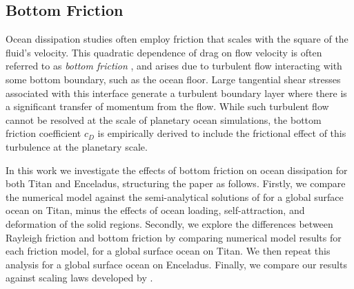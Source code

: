 \subsection{Bottom Friction}

Ocean dissipation studies often employ friction that scales with the square of the fluid's velocity. This quadratic dependence of drag on flow velocity is often referred to as \textit{bottom friction} \citep{gill1982atmosphere}, and arises due to turbulent flow interacting with some bottom boundary, such as the ocean floor. Large tangential shear stresses associated with this interface generate a turbulent boundary layer where there is a significant transfer of momentum from the flow. While such turbulent flow cannot be resolved at the scale of planetary ocean simulations, the bottom friction coefficient $c_D$ is empirically derived to include the frictional effect of this turbulence at the planetary scale.

In this work we investigate the effects of bottom friction on ocean dissipation for both Titan and Enceladus, structuring the paper as follows. Firstly, we compare the numerical model against the semi-analytical solutions of \citet{matsuyama2014tidal} for a global surface ocean on Titan, minus the effects of ocean loading, self-attraction, and deformation of the solid regions. Secondly, we explore the differences between Rayleigh friction and bottom friction by comparing numerical model results for each friction model, for a global surface ocean on Titan. We then repeat this analysis for a global surface ocean on Enceladus. Finally, we compare our results against scaling laws developed by \citep{chen2013tidal}.




